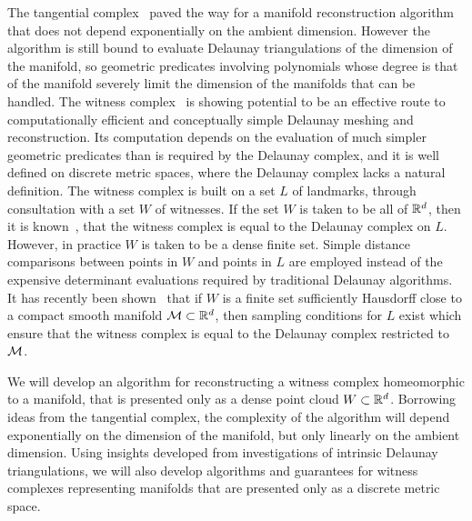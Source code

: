 The tangential complex~\cite{geometrica-7142i} paved the way for a
manifold reconstruction algorithm that does not depend exponentially
on the ambient dimension. However the algorithm is still bound to
evaluate Delaunay triangulations of the dimension of the manifold, so
geometric predicates involving polynomials whose degree is that of the
manifold severely limit the dimension of the manifolds that can be
handled.
%
The witness complex~\cite{deSilva2008} is showing potential to be an
effective route to computationally efficient and conceptually simple
Delaunay meshing and reconstruction. Its computation depends on the
evaluation of much simpler geometric predicates than is required by
the Delaunay complex, and it is well defined on discrete metric
spaces, where the Delaunay complex lacks a natural definition. 
%
The witness complex is built on a set $L$ of landmarks, through
consultation with a set $W$ of witnesses. If the set $W$ is taken to
be all of $\mathbb{R}^d$, then it is known~\cite{deSilva2008}, that the
witness complex is equal to the Delaunay complex on $L$. However, in
practice $W$ is taken to be a dense finite set. 
%
Simple distance comparisons between points in $W$ and points in $L$
are employed instead of the expensive determinant evaluations required
by traditional Delaunay algorithms.
%
It has
recently been shown~\cite{boissonnat2011cgl} that if $W$ is a finite
set sufficiently Hausdorff close to a compact smooth manifold $\mathcal{M}
\subset \mathbb{R}^d$, then sampling conditions for $L$ exist which ensure
that the witness complex is equal to the Delaunay complex restricted
to $\mathcal{M}$.

We will develop an algorithm for reconstructing a witness complex
homeomorphic to a manifold, that is presented only as a dense point
cloud $W \subset \mathbb{R}^d$. 
Borrowing ideas from the tangential complex, the complexity of the
algorithm will depend exponentially on the dimension of the
manifold, but only linearly on the ambient dimension. Using insights
developed from investigations of intrinsic Delaunay triangulations, we
will also develop algorithms and guarantees for witness complexes
representing manifolds that are presented only as a discrete metric
space.

